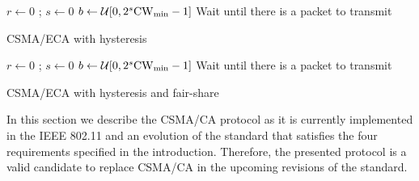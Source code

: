 \documentclass[conference]{IEEEtran}
\begin{document}
\begin{algorithm}
{
  $r \leftarrow 0$ ; $s \leftarrow 0$ \;
  $b \leftarrow \mathcal{U}[0,2^s\rm{CW}_{min}-1]$\;
  Wait until there is a packet to transmit \;
}
\vspace{0.2cm}
\caption{CSMA/ECA with hysteresis}
\label{alg:CSMA_ECA_hist}
\end{algorithm}


\begin{algorithm}
{
  $r \leftarrow 0$ ; $s \leftarrow 0$ \;
  $b \leftarrow \mathcal{U}[0,2^s\rm{CW}_{min}-1]$\;
  Wait until there is a packet to transmit \;
}
\vspace{0.2cm}
\caption{CSMA/ECA with hysteresis and fair-share}
\label{alg:CSMA_ECA_hist_fair}
\end{algorithm}

In this section we describe the CSMA/CA protocol as it is currently implemented in the IEEE 802.11 and an evolution of the standard that satisfies the four requirements specified in the introduction.
Therefore, the presented protocol is a valid candidate to replace CSMA/CA in the upcoming revisions of the standard.
\end{document}
